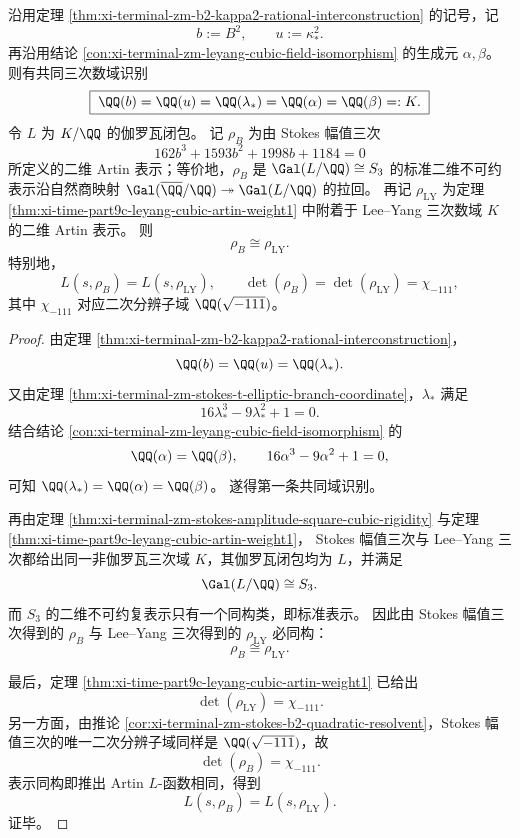 \begin{theorem}\label{thm:xi-terminal-zm-stokes-leyang-shared-artin-representation}
沿用定理 \ref{thm:xi-terminal-zm-b2-kappa2-rational-interconstruction} 的记号，记
\[
b:=B^2,
\qquad
u:=\kappa_*^2.
\]
再沿用结论 \ref{con:xi-terminal-zm-leyang-cubic-field-isomorphism} 的生成元 \(\alpha,\beta\)。
则有共同三次数域识别
\[
\boxed{\;
\QQ(b)=\QQ(u)=\QQ(\lambda_*)=\QQ(\alpha)=\QQ(\beta)=:K.\;}
\]
令 \(L\) 为 \(K/\QQ\) 的伽罗瓦闭包。
记 \(\rho_B\) 为由 Stokes 幅值三次
\[
162b^3+1593b^2+1998b+1184=0
\]
所定义的二维 Artin 表示；等价地，\(\rho_B\) 是 \(\Gal(L/\QQ)\cong S_3\) 的标准二维不可约表示沿自然商映射
\(\Gal(\overline\QQ/\QQ)\twoheadrightarrow \Gal(L/\QQ)\)
的拉回。
再记 \(\rho_{\mathrm{LY}}\) 为定理 \ref{thm:xi-time-part9c-leyang-cubic-artin-weight1} 中附着于 Lee--Yang 三次数域 \(K\) 的二维 Artin 表示。
则
\[
\boxed{\;\rho_B\cong \rho_{\mathrm{LY}}.\;}
\]
特别地，
\[
L(s,\rho_B)=L(s,\rho_{\mathrm{LY}}),
\qquad
\det(\rho_B)=\det(\rho_{\mathrm{LY}})=\chi_{-111},
\]
其中 \(\chi_{-111}\) 对应二次分辨子域 \(\QQ(\sqrt{-111})\)。
\end{theorem}
\begin{proof}
由定理 \ref{thm:xi-terminal-zm-b2-kappa2-rational-interconstruction}，
\[
\QQ(b)=\QQ(u)=\QQ(\lambda_*).
\]
又由定理 \ref{thm:xi-terminal-zm-stokes-t-elliptic-branch-coordinate}，\(\lambda_*\) 满足
\[
16\lambda_*^3-9\lambda_*^2+1=0.
\]
结合结论 \ref{con:xi-terminal-zm-leyang-cubic-field-isomorphism} 的
\[
\QQ(\alpha)=\QQ(\beta),
\qquad
16\alpha^3-9\alpha^2+1=0,
\]
可知 \(\QQ(\lambda_*)=\QQ(\alpha)=\QQ(\beta)\)。
遂得第一条共同域识别。

再由定理 \ref{thm:xi-terminal-zm-stokes-amplitude-square-cubic-rigidity} 与定理 \ref{thm:xi-time-part9c-leyang-cubic-artin-weight1}，
Stokes 幅值三次与 Lee--Yang 三次都给出同一非伽罗瓦三次域 \(K\)，其伽罗瓦闭包均为 \(L\)，并满足
\[
\Gal(L/\QQ)\cong S_3.
\]
而 \(S_3\) 的二维不可约复表示只有一个同构类，即标准表示。
因此由 Stokes 幅值三次得到的 \(\rho_B\) 与 Lee--Yang 三次得到的 \(\rho_{\mathrm{LY}}\) 必同构：
\[
\rho_B\cong \rho_{\mathrm{LY}}.
\]

最后，定理 \ref{thm:xi-time-part9c-leyang-cubic-artin-weight1} 已给出
\[
\det(\rho_{\mathrm{LY}})=\chi_{-111}.
\]
另一方面，由推论 \ref{cor:xi-terminal-zm-stokes-b2-quadratic-resolvent}，Stokes 幅值三次的唯一二次分辨子域同样是 \(\QQ(\sqrt{-111})\)，故
\[
\det(\rho_B)=\chi_{-111}.
\]
表示同构即推出 Artin \(L\)-函数相同，得到
\[
L(s,\rho_B)=L(s,\rho_{\mathrm{LY}}).
\]
证毕。
\end{proof}

\endinput
